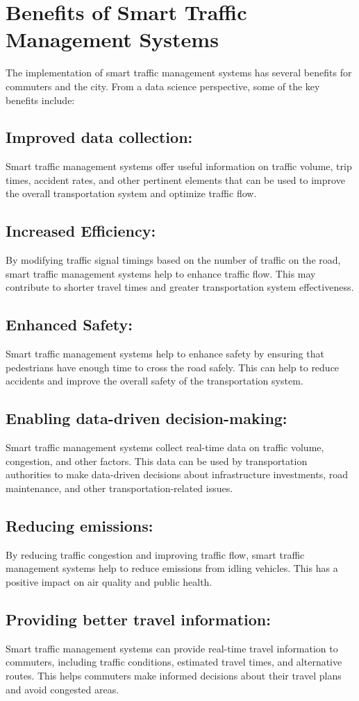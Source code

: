 \documentclass[12pt,a4paper]{article}
\begin{document}
\section{Benefits of Smart Traffic Management Systems}
	The implementation of smart traffic management systems has several benefits for commuters and the city. From a data science perspective, some of the key benefits include:
	\subsection{Improved data collection:} 
	Smart traffic management systems offer useful information on traffic volume, trip times, accident rates, and other pertinent elements that can be used to improve the overall transportation system and optimize traffic flow.
	\subsection{Increased Efficiency:}
	By modifying traffic signal timings based on the number of traffic on the road, smart traffic management systems help to enhance traffic flow. This may contribute to shorter travel times and greater transportation system effectiveness.
	\subsection{Enhanced Safety:}
	Smart traffic management systems help to enhance safety by ensuring that pedestrians have enough time to cross the road safely. This can help to reduce accidents and improve the overall safety of the transportation system.
	\subsection{Enabling data-driven decision-making:} 
	Smart traffic management systems collect real-time data on traffic volume, congestion, and other factors. This data can be used by transportation authorities to make data-driven decisions about infrastructure investments, road maintenance, and other transportation-related issues.
	\subsection{Reducing emissions:}
	By reducing traffic congestion and improving traffic flow, smart traffic management systems help to reduce emissions from idling vehicles. This has a positive impact on air quality and public health.
	\subsection{Providing better travel information:} 
	Smart traffic management systems can provide real-time travel information to commuters, including traffic conditions, estimated travel times, and alternative routes. This helps commuters make informed decisions about their travel plans and avoid congested areas.
	
\end{document}
